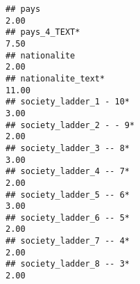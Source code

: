 \documentclass[
]{article}
\begin{document}
\begin{verbatim}
## pays                                                                                                                                                                                                                         2.00
## pays_4_TEXT*                                                                                                                                                                                                                 7.50
## nationalite                                                                                                                                                                                                                  2.00
## nationalite_text*                                                                                                                                                                                                           11.00
## society_ladder_1 - 10*                                                                                                                                                                                                       3.00
## society_ladder_2 - - 9*                                                                                                                                                                                                      2.00
## society_ladder_3 -- 8*                                                                                                                                                                                                       3.00
## society_ladder_4 -- 7*                                                                                                                                                                                                       2.00
## society_ladder_5 -- 6*                                                                                                                                                                                                       3.00
## society_ladder_6 -- 5*                                                                                                                                                                                                       2.00
## society_ladder_7 -- 4*                                                                                                                                                                                                       2.00
## society_ladder_8 -- 3*                                                                                                                                                                                                       2.00

\end{verbatim}
\end{document}
